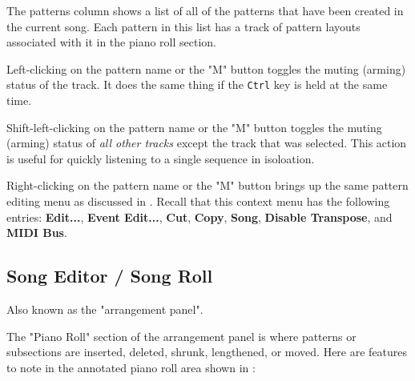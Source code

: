    The patterns column shows a list of all of the patterns that have been
   created in the current song.  Each pattern in this list has a track of
   pattern layouts associated with it in the piano roll section.

   Left-clicking on the pattern name or the "M" button toggles the muting
   (arming) status of the track.
   It does the same thing if the \texttt{Ctrl} key is held at the same time.

   Shift-left-clicking on the pattern name or the "M" button toggles the muting
   (arming) status of \textsl{all other tracks} except the track that was
   selected.  This action is useful for quickly listening to a single sequence
   in isoloation.

   Right-clicking on the pattern name or the "M" button brings up the same
   pattern editing menu as discussed in
   .
   Recall that this context menu has the following entries:
   \textbf{Edit...}, \textbf{Event Edit...}, \textbf{Cut}, \textbf{Copy},
   \textbf{Song}, \textbf{Disable Transpose}, and \textbf{MIDI Bus}.

\subsection{Song Editor / Song Roll}
\label{subsec:song_editor_arrangement_panel}

   Also known as the "arrangement panel".

   The "Piano Roll" section of the arrangement panel is where patterns or
   subsections are inserted, deleted, shrunk, lengthened, or moved.
   Here are features to note in the annotated piano roll area
   shown in :

